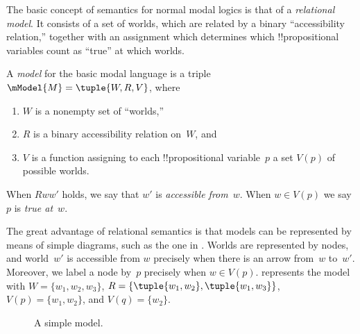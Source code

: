 \documentclass[../../../include/open-logic-section]{subfiles}
\begin{document}


The basic concept of semantics for normal modal logics is that of a
\emph{relational model}. It consists of a set of worlds, which are
related by a binary ``accessibility relation,'' together with an
assignment which determines which !!{propositional variable}s count as
``true'' at which worlds.

\begin{defn}
  A \emph{model} for the basic modal language is a triple $\mModel{M}
  = \tuple{W, R, V}$, where
  \begin{enumerate}
  \item $W$ is a nonempty set of ``worlds,''
  \item $R$ is a binary accessibility relation on~$W$, and
  \item $V$ is a function assigning to each !!{propositional
    variable}~$p$ a set $V(p)$ of possible worlds.
  \end{enumerate}
  When $Rww'$ holds, we say that $w'$ is \emph{accessible
    from}~$w$. When $w \in V(p)$ we say $p$ is \emph{true at}~$w$.
\end{defn}

The great advantage of relational semantics is that models can be
represented by means of simple diagrams, such as the one in
. Worlds are represented by nodes, and world~$w'$ is
accessible from $w$ precisely when there is an arrow from~$w$
to~$w'$. Moreover, we label a node by~$p$ precisely when $w \in
V(p)$.  represents the model with $W = \{w_1, w_2,
w_3\}$, $R = \{\tuple{w_1, w_2},\tuple{w_1, w_3}\}$, $V(p) = \{w_1,
w_2\}$, and $V(q) = \{w_2\}$.

\begin{figure}
  \begin{center}
  \end{center}
\caption{A simple model.}
\end{figure}
\end{document}
